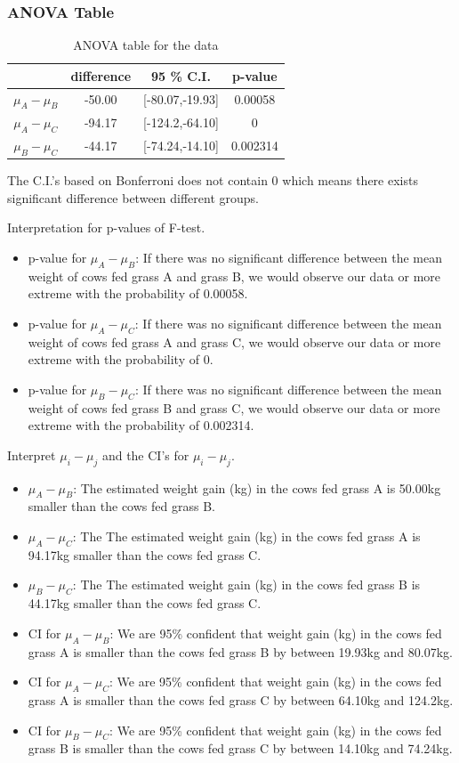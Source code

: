 \documentclass[a4paper,11pt,onecolumn,twoside]{article}
\begin{document}
\subsubsection{ANOVA Table}
\begin{table}[H]
	\centering
	\begin{tabular}{cccc}
		\midrule[1.5pt]	
		&difference &95 \% C.I. &p-value\\
		\hline
		$\mu_A-\mu_B$&-50.00&[-80.07,-19.93]&0.00058\\
		$\mu_A-\mu_C$&-94.17&[-124.2,-64.10]&0\\		 $\mu_B-\mu_{C}$&-44.17&[-74.24,-14.10]&0.002314\\
		\midrule[1.5pt]
	\end{tabular}
	\caption{ANOVA table for the data}
\end{table}
The C.I.'s based on Bonferroni does not contain 0 which means there exists significant difference between different groups.\par 
Interpretation  for p-values of F-test.
\begin{itemize}
	\item p-value for $\mu_A-\mu_B$: If there was no significant difference between the mean weight of cows fed grass A and grass B, we would observe our data or more extreme with the probability of 0.00058.
	\item p-value for $\mu_A-\mu_C$: If there was no significant difference between the mean weight of cows fed grass A and grass C, we would observe our data or more extreme with the probability of 0.
	\item p-value for $\mu_B-\mu_C$: If there was no significant difference between the mean weight of cows fed grass B and grass C, we would observe our data or more extreme with the probability of 0.002314.
\end{itemize}
\par
Interpret $\mu_i-\mu_j$ and the CI's for $\mu_i-\mu_j$.
\begin{itemize}
	\item $\mu_A-\mu_B$: The estimated weight gain (kg) in the cows fed grass A is 50.00kg smaller than the cows fed grass B.
	\item $\mu_A-\mu_C$: The The estimated weight gain (kg) in the cows fed grass A is 94.17kg smaller than the cows fed grass C.
	\item $\mu_B-\mu_C$: The The estimated weight gain (kg) in the cows fed grass B is 44.17kg smaller than the cows fed grass C.
\end{itemize}
\begin{itemize}
	\item CI for $\mu_A-\mu_B$: We are 95\% confident that weight gain (kg) in the cows fed grass A is smaller than the cows fed grass B by between 19.93kg and 80.07kg.
	\item CI for $\mu_A-\mu_C$: We are 95\% confident that weight gain (kg) in the cows fed grass A is smaller than the cows fed grass C by between 64.10kg and 124.2kg.
	\item CI for $\mu_B-\mu_C$: We are 95\% confident that weight gain (kg) in the cows fed grass B is smaller than the cows fed grass C by between 14.10kg and 74.24kg.
\end{itemize}
\end{document}
